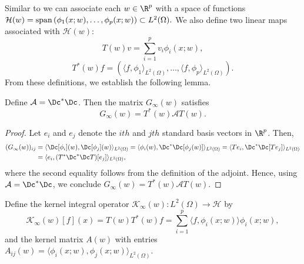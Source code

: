 Similar to \citet{de2023operator} we can associate each $w\in\R^p$ with a space of functions $\mathcal H(w) = \textup{span}\left(\phi_1(x;w),\dots,\phi_p(x;w)\right)\subset L^2(\Omega).$
We also define two linear maps associated with $\mathcal H(w)$:
\[
T(w)v = \sum_{i=1}^{p}v_i\phi_i(x;w),
\]
\[
T^{*}(w)f = \left(\langle f,\phi_1\rangle_{L^2(\Omega)},\dots,\langle f,\phi_p\rangle_{L^2(\Omega)}\right).
\]
From these definitions, we establish the following lemma. 
\begin{lemma}
\label{lemma:Pop-GN}
Define $\mathcal A = \Dc^{*}\Dc$. 
Then the matrix $G_{\infty}(w)$ satisfies
    \[
    G_{\infty}(w) = T^{*}(w)\mathcal A T(w). 
    \]
\end{lemma}
\begin{proof}
Let $e_i$ and $e_j$ denote the $ith$ and $jth$ standard basis vectors in $\R^p$. 
Then,
\begin{align*}
(G_{\infty}(w))_{ij} &= \langle \Dc[\phi_i](w), \Dc[\phi_j](w)\rangle_{L^2(\Omega)} = \langle \phi_i(w),\Dc^{*}\Dc[\phi_j(w)] \rangle_{L^2(\Omega)} = \langle Te_i, \Dc^{*}\Dc[Te_j]\rangle_{L^2(\Omega)} \\
&= \langle e_i, (T^{*}\Dc^{*}\Dc T)[e_j]\rangle_{L^2(\Omega)},
\end{align*}
where the second equality follows from the definition of the adjoint. 
Hence, using $\mathcal A = \Dc^{*}\Dc$, we conclude $G_{\infty}(w) = T^{*}(w)\mathcal A T(w)$.
\end{proof}

Define the kernel integral operator $\mathcal K_{\infty}(w):L^2(\Omega)\rightarrow \mathcal H$ by
\begin{equation}
\label{eq:kern_op}
\mathcal K_{\infty}(w)[f](x) = T(w)T^{*}(w)f = \sum_{i=1}^{p}\langle f,\phi_i(x;w)\rangle \phi_i(x;w),
\end{equation}
and the kernel matrix $A(w)$ with entries $A_{ij}(w) = \langle \phi_{i}(x;w),\phi_{j}(x;w)\rangle_{L^2(\Omega)}$. 

